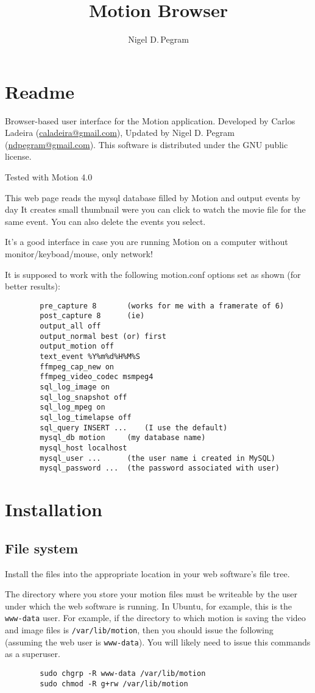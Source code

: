 \documentclass[12pt]{scrartcl} %
\title{Motion Browser}
\author{Nigel D.\,Pegram}
\begin{document}
\maketitle
\tableofcontents

\section{Readme}
	Browser-based user interface for the Motion application.
	Developed by Carlos Ladeira (\href{mailto:caladeira@gmail.com}{caladeira@gmail.com}),
	Updated by Nigel D. Pegram (\href{mailto:ndpegram@gmail.com}{ndpegram@gmail.com}).
	This software is distributed under the GNU public license.

	Tested with Motion 4.0

	This web page reads the mysql database filled by Motion and
	output events by day 	It creates small thumbnail were you can click to watch the movie
	file for the same event. You can also delete the events you select.

	It's a good interface in case you are running Motion on a computer
	without monitor/keyboad/mouse, only network!

	It is supposed to work with the following motion.conf
	options set as shown (for better results):

	\begin{verbatim}
		pre_capture 8		(works for me with a framerate of 6)
		post_capture 8		(ie)
		output_all off
		output_normal best (or) first
		output_motion off
		text_event %Y%m%d%H%M%S
		ffmpeg_cap_new on
		ffmpeg_video_codec msmpeg4
		sql_log_image on
		sql_log_snapshot off
		sql_log_mpeg on
		sql_log_timelapse off
		sql_query INSERT ...	(I use the default)
		mysql_db motion		(my database name)
		mysql_host localhost
		mysql_user ...		(the user name i created in MySQL)
		mysql_password ...	(the password associated with user)
	\end{verbatim}

\section{Installation}

	\subsection{File system}
	Install the files into the appropriate location in your web software's file tree.

	The directory where you store your motion files must be writeable by the user under which
	the web software is running. In Ubuntu, for example, this is the \texttt{www-data} user.
	For example, if the directory to which motion is saving the video and image files is \texttt{/var/lib/motion},
	then you should issue the following (assuming the web user is \texttt{www-data}).
	You will likely need to issue this commands as a superuser.
	\begin{verbatim}
		sudo chgrp -R www-data /var/lib/motion
		sudo chmod -R g+rw /var/lib/motion
	\end{verbatim}
\end{document}
